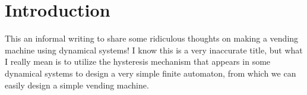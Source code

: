 \documentclass[12pt]{article}
\begin{document}
 
  
  \vspace{-1.8cm}


\newpage

\section{Introduction}
This an informal writing to share some ridiculous thoughts on making a vending machine using dynamical systems! I know this is a very inaccurate title, but what I really mean is to utilize the hysteresis mechanism that appears in some dynamical systems to design a very simple finite automaton, from which we can easily design a simple vending machine.   
\end{document}
